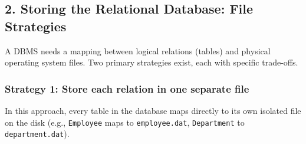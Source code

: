 \documentclass[12pt,a3paper]{article}
\begin{document}
\begin{enumerate}
\begin{tcolorbox}[enhanced,breakable,ansbox,colback=cA!4,colframe=cA,boxrule=0.8pt,arc=5pt,title={\textbf{Answer}},fonttitle=\bfseries\color{white},colbacktitle=cA]
\subsection*{2. Storing the Relational Database: File Strategies}

A DBMS needs a mapping between logical relations (tables) and physical operating system files. Two primary strategies exist, each with specific trade-offs.

\subsubsection*{Strategy 1: Store each relation in one separate file}
In this approach, every table in the database maps directly to its own isolated file on the disk (e.g., \texttt{Employee} maps to \texttt{employee.dat}, \texttt{Department} to \texttt{department.dat}).


\end{tcolorbox}
\end{enumerate}
\end{document}
